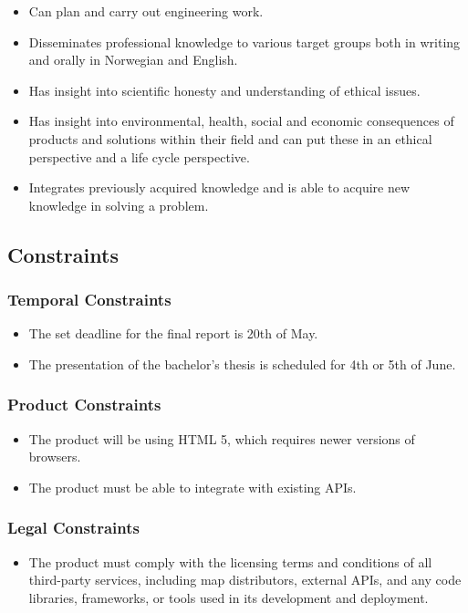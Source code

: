 \begin{itemize}
\begin{itemize}
        \item Can plan and carry out engineering work.
        \item Disseminates professional knowledge to various target groups both in writing and orally in Norwegian and English.
        \item Has insight into scientific honesty and understanding of ethical issues.
        \item Has insight into environmental, health, social and economic consequences of products and solutions within their field and can put these in an ethical perspective and a life cycle perspective.
        \item Integrates previously acquired knowledge and is able to acquire new knowledge in solving a problem.
    \end{itemize}
\end{itemize}

\subsection{Constraints}
\subsubsection{Temporal Constraints}
\begin{itemize}
    \item The set deadline for the final report is 20th of May.
    \item The presentation of the bachelor's thesis is scheduled for 4th or 5th of June.
\end{itemize}

\subsubsection{Product Constraints}
\begin{itemize}
    \item The product will be using HTML 5, which requires newer versions of browsers.
    \item The product must be able to integrate with existing APIs.
\end{itemize}

\subsubsection{Legal Constraints}
\begin{itemize}
    \item The product must comply with the licensing terms and conditions of all third-party services, including map distributors, external APIs, and any code libraries, frameworks, or tools used in its development and deployment.
\end{itemize}